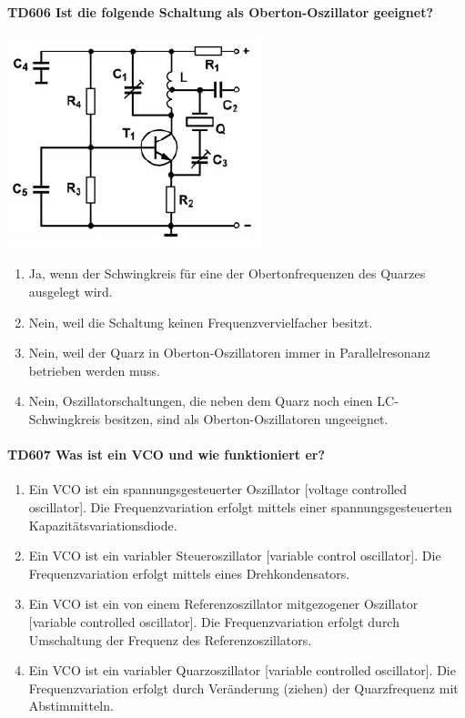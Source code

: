 \documentclass[8pt]{article}
\begin{document}
\begin{enumerate}
\begin{enumerate}[nolistsep,label=\Alph*]
\paragraph*{TD606 Ist die folgende Schaltung als Oberton-Oszillator geeignet?}
\begin{center}
	\begin{minipage}{\linewidth}
		\centering
		\includegraphics[scale=1.0]{pics/td606_a.jpg}
	\end{minipage}
\end{center}
\begin{enumerate}[nolistsep,label=\Alph*]
\item Ja, wenn der Schwingkreis für eine der Obertonfrequenzen des Quarzes ausgelegt wird.
\item Nein, weil die Schaltung keinen Frequenzvervielfacher besitzt.
\item Nein, weil der Quarz in Oberton-Oszillatoren immer in Parallelresonanz betrieben werden muss.
\item Nein, Oszillatorschaltungen, die neben dem Quarz noch einen LC-Schwingkreis besitzen, sind als Oberton-Oszillatoren ungeeignet.
\end{enumerate}

\paragraph*{TD607 Was ist ein VCO und wie funktioniert er?}
\begin{enumerate}[nolistsep,label=\Alph*]
\item Ein VCO ist ein spannungsgesteuerter Oszillator [voltage controlled oscillator]. Die Frequenzvariation erfolgt mittels einer spannungsgesteuerten Kapazitätsvariationsdiode.
\item Ein VCO ist ein variabler Steueroszillator [variable control oscillator]. Die Frequenzvariation erfolgt mittels eines Drehkondensators.
\item Ein VCO ist ein von einem Referenzoszillator mitgezogener Oszillator [variable controlled oscillator]. Die Frequenzvariation erfolgt durch Umschaltung der Frequenz des Referenzoszillators.
\item Ein VCO ist ein variabler Quarzoszillator [variable controlled oscillator]. Die Frequenzvariation erfolgt durch Veränderung (ziehen) der Quarzfrequenz mit Abstimmitteln.
\end{enumerate}


\end{enumerate}
\end{enumerate}
\end{document}

